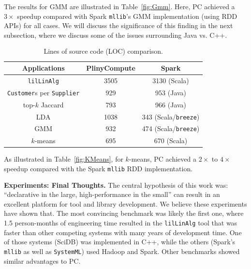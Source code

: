 The results for GMM are illustrated in Table~\ref{fig:Gmm}. Here, PC achieved a 
$3\times$ speedup compared with Spark \texttt{mllib}'s GMM implementation
(using RDD APIs) for all cases.  We will discuss the significance of this finding in the next subsection, where we discuss
some of the issues surrounding Java vs. C++.  


\begin{table}[H]
\small
\begin{center}
\begin{tabular}{|c||c|c|}
\hline
Applications & PlinyCompute & Spark\\
\hline
\texttt{lilLinAlg} &3505& 3130 (Scala)\\
\texttt{Customer}s per \texttt{Supplier}&929 &953 (Java)\\
top-$k$ Jaccard &793 & 966 (Java)\\
LDA &1038  &343 (Scala/\texttt{breeze})\\
GMM&932 & 474 (Scala/\texttt{breeze})\\
$k$-means &695  &670 (Scala)\\
\hline
\end{tabular}
\caption{Lines of source code (LOC) comparison.}
\label{fig:LOC}
\end{center}
\vspace{-20pt}
\end{table}


As illustrated in Table~\ref{fig:KMeans}, for $k$-means, PC achieved a $2\times$ to
$4\times$ speedup compared with the Spark \texttt{mllib} RDD implementation.

\vspace{5pt}
\noindent
\textbf{Experiments: Final Thoughts.} The central hypothesis of this
work was: ``declarative in the large, high-performance in the small'' can result
in an excellent platform for tool and library development.  We believe these experiments have shown that.  The
most convincing benchmark was likely the first one, where 1.5
person-months of engineering time resulted in the \texttt{lilLinAlg} tool that 
was faster than other competing systems with many years of development time.  One of those systems (SciDB)
was implemented in C++, while the others (Spark's \texttt{mllib} as well as \texttt{SystemML}) used Hadoop and Spark.  
Other benchmarks showed similar advantages to PC.

